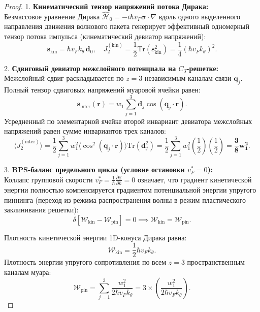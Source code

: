 \documentclass[12pt,a4paper]{article}
\begin{document}
	\begin{proof}
		1. \textbf{Кинематический тензор напряжений потока Дирака:}\\
		Безмассовое уравнение Дирака $\hat{\mathcal{H}}_0 = -i \hbar v_F \boldsymbol{\sigma} \cdot \nabla$ вдоль одного выделенного направления движения волнового пакета генерирует эффективный одномерный тензор потока импульса (кинематический девиатор напряжений):
		\begin{equation}
			\mathbf{s}_{\text{kin}} = \hbar v_F k_\theta \, \mathbf{d}_0, \quad J_2^{(\text{kin})} = \frac{1}{2}\mathrm{Tr}(\mathbf{s}_{\text{kin}}^2) = \frac{1}{4} (\hbar v_F k_\theta)^2.
		\end{equation}
		
		2. \textbf{Сдвиговый девиатор межслойного потенциала на $C_3$-решетке:}\\
		Межслойный сдвиг раскладывается по $z=3$ независимым каналам связи $\mathbf{q}_j$. Полный тензор сдвиговых напряжений муаровой ячейки равен:
		\begin{equation}
			\mathbf{s}_{\text{inter}}(\mathbf{r}) = w_1 \sum_{j=1}^3 \mathbf{d}_j \cos(\mathbf{q}_j \cdot \mathbf{r}).
		\end{equation}
		Усредненный по элементарной ячейке второй инвариант девиатора межслойных напряжений равен сумме инвариантов трех каналов:
		\begin{equation}
			\langle J_2^{(\text{inter})} \rangle = \frac{1}{2} \sum_{j=1}^3 w_1^2 \langle \cos^2(\mathbf{q}_j \cdot \mathbf{r}) \rangle \mathrm{Tr}(\mathbf{d}_j^2) = \frac{1}{2} \sum_{j=1}^3 w_1^2 \left(\frac{1}{2}\right) \left(\frac{1}{2}\right) = \mathbf{\frac{3}{8} w_1^2}.
		\end{equation}
		
		3. \textbf{BPS-баланс предельного цикла (условие остановки $v_F^* = 0$):}\\
		Коллапс групповой скорости $v_F^* = \frac{1}{\hbar}\frac{\partial \mathcal{E}}{\partial k} = 0$ означает, что градиент кинетической энергии полностью компенсируется градиентом потенциальной энергии упругого пиннинга (переход из режима распространения волны в режим пластического заклинивания решетки):
		\begin{equation}
			\delta \left[ \mathcal{W}_{\text{kin}} - \mathcal{W}_{\text{pin}} \right] = 0 \implies \mathcal{W}_{\text{kin}} = \mathcal{W}_{\text{pin}}.
		\end{equation}
		
		Плотность кинетической энергии 1D-конуса Дирака равна:
		\begin{equation}
			\mathcal{W}_{\text{kin}} = \frac{1}{2} \hbar v_F k_\theta.
		\end{equation}
		Плотность энергии упругого сопротивления по всем $z=3$ пространственным каналам муара:
		\begin{equation}
			\mathcal{W}_{\text{pin}} = \sum_{j=1}^3 \frac{w_1^2}{2 \hbar v_F k_\theta} = 3 \times \left( \frac{w_1^2}{2 \hbar v_F k_\theta} \right).
		\end{equation}
		

\end{proof}
\end{document}
